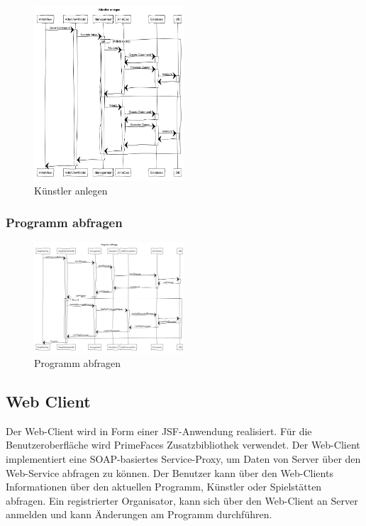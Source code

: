\documentclass[12pt, a4paper]{article}
\begin{document}
\begin{figure}[h] 	
	\centering
		\includegraphics[width=0.5\textwidth]{SeqKunstlerAnlegen.png}
	\caption{Künstler anlegen}
\end{figure}

\subsubsection{Programm abfragen}

\begin{figure}[h] 	
	\centering
		\includegraphics[width=0.5\textwidth]{SeqProgrammAbfragen.png}
	\caption{Programm abfragen}
\end{figure}

\clearpage
\subsection{Web Client}

Der Web-Client wird in Form einer JSF-Anwendung realisiert. Für die Benutzeroberfläche wird PrimeFaces Zusatzbibliothek verwendet. Der Web-Client implementiert eine SOAP-basiertes Service-Proxy, um Daten von Server über den Web-Service abfragen zu können. Der Benutzer kann über den Web-Clients Informationen über den aktuellen Programm, Künstler oder Spielstätten abfragen. Ein registrierter Organisator, kann sich über den Web-Client an Server anmelden und kann Änderungen am Programm durchführen. 
\end{document}
